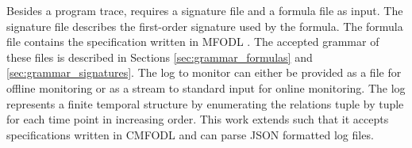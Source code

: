 Besides a program trace, \MonPoly requires a signature file and a formula file as input. The signature file describes the first-order signature used by the formula. The formula file contains the specification written in MFODL \cite{basinMonPolyMonitoringTool2017}. The accepted grammar of these files is described in Sections \ref{sec:grammar_formulas} and \ref{sec:grammar_signatures}. The log to monitor can either be provided as a file for offline monitoring or as a stream to standard input for online monitoring. The log represents a finite temporal structure by enumerating the relations tuple by tuple for each time point in increasing order. This work extends \MonPoly such that it accepts specifications written in CMFODL and can parse JSON formatted log files.

